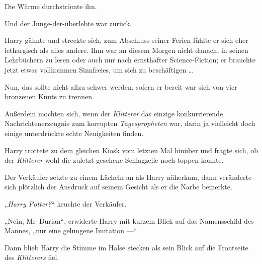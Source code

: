 Die Wärme durchströmte ihn.

Und der Junge-der-überlebte war zurück.

Harry gähnte und streckte sich, zum Abschluss seiner Ferien fühlte er sich eher lethargisch als alles andere. Ihm war an diesem Morgen nicht danach, in seinen Lehrbüchern zu lesen oder auch nur nach ernsthafter Science-Fiction; er brauchte jetzt etwas vollkommen Sinnfreies, um sich zu beschäftigen …

Nun, das sollte nicht allzu schwer werden, sofern er bereit war sich von vier bronzenen Knuts zu trennen.

Außerdem mochten sich, wenn der \emph{Klitterer} das einzige konkurrierende Nachrichtenerzeugnis zum korrupten \emph{Tagespropheten} war, darin ja vielleicht doch einige unterdrückte echte Neuigkeiten finden.

Harry trottete zu dem gleichen Kiosk vom letzten Mal hinüber und fragte sich, ob der \emph{Klitterer} wohl die zuletzt gesehene Schlagzeile noch toppen konnte.

Der Verkäufer setzte zu einem Lächeln an als Harry näherkam, dann veränderte sich plötzlich der Ausdruck auf seinem Gesicht als er die Narbe bemerkte.

„\emph{Harry Potter?}“ keuchte der Verkäufer.

„Nein, Mr~Durian“, erwiderte Harry mit kurzem Blick auf das Namensschild des Mannes, „nur eine gelungene Imitation —“

Dann blieb Harry die Stimme im Halse stecken als sein Blick auf die Frontseite des \emph{Klitterers} fiel.

